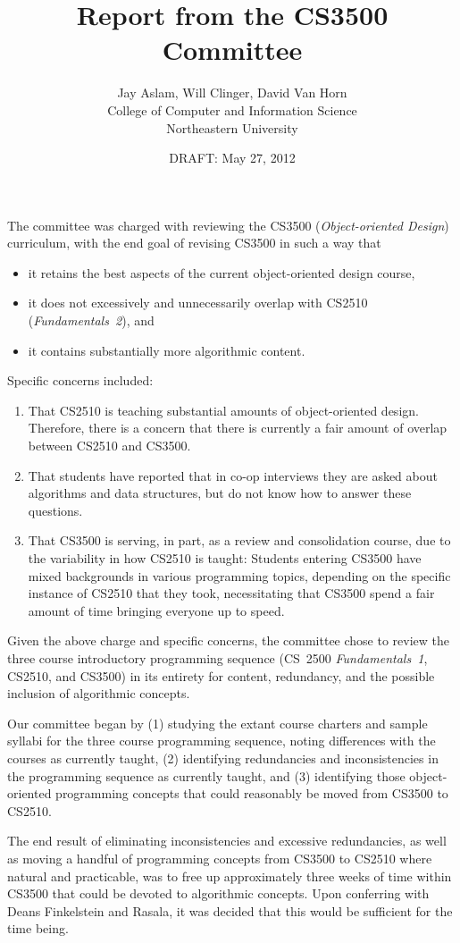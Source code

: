 \documentclass[11pt]{article}
\title{Report from the CS3500 Committee}
\author{Jay Aslam, Will Clinger, David Van Horn\\
        College of Computer and Information Science \\
        Northeastern University}
\date{DRAFT: May 27, 2012}
\begin{document}
\maketitle

The committee was charged with reviewing the CS3500 (\emph{Object-oriented Design}) curriculum, with the end goal of revising CS3500 in such a way that
%
\begin{itemize}
\item it retains the best aspects of the current object-oriented design course,
\item it does not excessively and unnecessarily overlap with CS2510 (\emph{Fundamentals~2}), and
\item it contains substantially more algorithmic content.
\end{itemize}
%
Specific concerns included:
%
\begin{enumerate}
\item That CS2510 is teaching substantial amounts of object-oriented design.  Therefore, there is a concern that there is currently a fair amount of overlap between CS2510 and CS3500.
\item That students have reported that in co-op interviews they are asked about algorithms and data structures, but do not know how to answer these questions.
\item That CS3500 is serving, in part, as a review and consolidation course, due to the variability in how CS2510 is taught: Students entering CS3500 have mixed backgrounds in various programming topics, depending on the specific instance of CS2510 that they took, necessitating that CS3500 spend a fair amount of time bringing everyone up to speed.
\end{enumerate}

Given the above charge and specific concerns, the committee chose to review the three course introductory programming sequence (CS~2500 \emph{Fundamentals~1}, CS2510, and CS3500) in its entirety for content, redundancy, and the possible inclusion of algorithmic concepts.

Our committee began by (1) studying the extant course charters and sample syllabi for the three course programming sequence, noting differences with the courses as currently taught, (2) identifying redundancies and inconsistencies in the programming sequence as currently taught, and (3) identifying those object-oriented programming concepts that could reasonably be moved from CS3500 to CS2510.

The end result of eliminating inconsistencies and excessive redundancies, as well as moving a handful of programming concepts from CS3500 to CS2510 where natural and practicable, was to free up approximately three weeks of time within CS3500 that could be devoted to algorithmic concepts.  Upon conferring with Deans Finkelstein and Rasala, it was decided that this would be sufficient for the time being.
\end{document}
